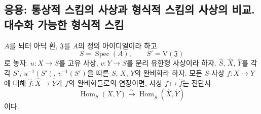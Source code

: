 \subsection{응용: 통상적 스킴의 사상과 형식적 스킴의 사상의 비교.
대수화 가능한 형식적 스킴}
\label{subsection:III.5.4-fr}

\begin{theorem}[5.4.1]
\label{III.5.4.1-fr}
$A$를 뇌터 아딕 환, $\mathfrak J$를 $A$의 정의 아이디얼이라 하고
\[
S=\operatorname{Spec}(A),\qquad S'=\mathrm V(\mathfrak J)
\]
로 놓자. $u:X\to S$를 고유 사상, $v:Y\to S$를 분리 유한형
사상이라 하자. $\widehat S$, $\widehat X$, $\widehat Y$를 각각
$S'$, $u^{-1}(S')$, $v^{-1}(S')$을 따른 $S$, $X$, $Y$의
완비화라 하자. 모든 $S$-사상 $f:X\to Y$에 대해
$\widehat f:\widehat X\to\widehat Y$가 $f$의 완비화들로의
연장이면, 사상 $f\mapsto\widehat f$는 전단사
\[
\operatorname{Hom}_S(X,Y)\xrightarrow{\ \sim\ }
\operatorname{Hom}_{\widehat S}(\widehat X,\widehat Y)
\]
이다.
\end{theorem}

